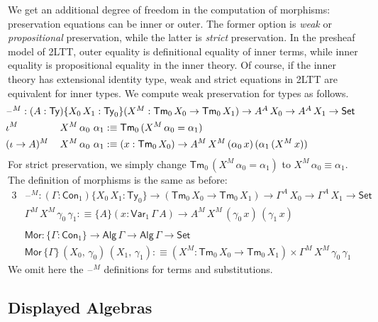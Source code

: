 \documentclass[12pt,a4paper,twoside,openany]{book}
\theoremstyle{remark}
\theoremstyle{definition}
\theoremstyle{theorem}
\newcommand{\ms}[1]{\mathsf{#1}}
\newcommand{\Con}{\mathsf{Con}}
\newcommand{\Tm}{\mathsf{Tm}}
\newcommand{\Ty}{\mathsf{Ty}}
\newcommand{\blank}{\mathord{\hspace{1pt}\text{--}\hspace{1pt}}}
\newcommand{\Set}{\mathsf{Set}}
\newcommand{\Var}{\ms{Var}}
\newcommand{\Alg}{\ms{Alg}}
\newcommand{\Mor}{\ms{Mor}}
\newcommand{\defn}{:\equiv}
\begin{document}
We get an additional degree of freedom in the computation of morphisms:
preservation equations can be inner or outer. The former option is \emph{weak}
or \emph{propositional} preservation, while the latter is \emph{strict}
preservation. In the presheaf model of 2LTT, outer equality is definitional
equality of inner terms, while inner equality is propositional equality in the
inner theory. Of course, if the inner theory has extensional identity type,
weak and strict equations in 2LTT are equivalent for inner types. We compute
weak preservation for types as follows.
\begin{alignat*}{3}
  & \hspace{-5em}\rlap{$\blank^M : (A : \Ty)\{X_0\,X_1 : \Ty_0\}(X^M : \Tm_0\,X_0 \to \Tm_0\,X_1) \to A^A\,X_0 \to A^A\,X_1 \to \Set$}\\
  & \hspace{-5em}\iota^M\,&&X^M\,\alpha_0\,\,\alpha_1 \defn \Tm_0\,(X^M\,\alpha_0 = \alpha_1) \\
  & \hspace{-5em}(\iota\to A)^M\,&&X^M\,\alpha_0\,\,\alpha_1 \defn
       (x : \Tm_0\,X_0) \to A^M\,X^M\,(\alpha_0\,x)\,(\alpha_1\,(X^M\,x))
\end{alignat*}
For strict preservation, we simply change $\Tm_0\,(X^M\,\alpha_0 = \alpha_1)$ to
$X^M\,\alpha_0 \equiv \alpha_1$. The definition of morphisms is the same as
before:
\begin{alignat*}{3}
  &\blank^M : (\Gamma : \Con_1)\{X_0\,X_1 : \Ty_0\} \to (\Tm_0\,X_0 \to \Tm_0\,X_1) \to \Gamma^A\,X_0 \to \Gamma^A\,X_1 \to \Set\\
  &\Gamma^M\,X^M\,\gamma_0\,\gamma_1 \defn
  \{A\}(x : \Var_1\,\Gamma\,A) \to A^M\,X^M\,(\gamma_0\,x)\,(\gamma_1\,x)\\
  & \\
  &\Mor : \{\Gamma : \Con_1\} \to \Alg\,\Gamma \to \Alg\,\Gamma \to \Set \\
  &\Mor\,\{\Gamma\}\,(X_0,\,\gamma_0)\,(X_1,\,\gamma_1) \defn (X^M : \Tm_0\,X_0 \to \Tm_0\,X_1) \times \Gamma^M\,X^M\,\gamma_0\,\gamma_1
\end{alignat*}
We omit here the $\blank^M$ definitions for terms and substitutions.

\subsection{Displayed Algebras}
\end{document}
